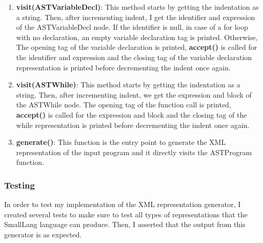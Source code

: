 \documentclass{article}
\begin{document}
\begin{enumerate}
					\item \textbf{visit(ASTVariableDecl)}: This method starts by getting the indentation as a string. Then, after incrementing indent, I get the identifier and expression of the ASTVariableDecl node. If the identifier is null, in case of a for loop with no declaration, an empty variable declaration tag is printed. Otherwise, The opening tag of the variable declaration is printed, \textbf{accept()} is called for the identifier and expression and the closing tag of the variable declaration representation is printed before decrementing the indent once again.
					
						\item \textbf{visit(ASTWhile)}: This method starts by getting the indentation as a string. Then, after incrementing indent, we get the expression and block of the ASTWhile node. The opening tag of the function call is printed, \textbf{accept()} is called for the expression and block and the closing tag of the while representation is printed before decrementing the indent once again.
						
						\item \textbf{generate()}: This function is the entry point to generate the XML representation of the input program and it directly visits the ASTProgram function.
					
						
				\end{enumerate}
				
				
				\subsubsection{Testing}
				
				In order to test my implementation of the XML representation generator, I created several tests to make sure to test all types of representations that the SmallLang language can produce. Then, I asserted that the output from this generator is as expected.
				
\end{document}
